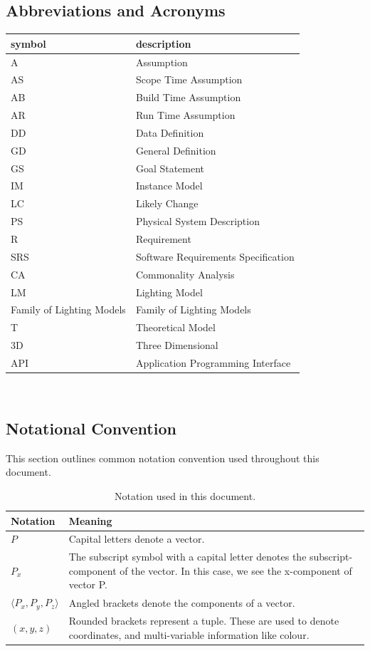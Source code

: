 \documentclass[12pt]{article}
\newcommand{\famname}{Family of Lighting Models} %
\begin{document}
\subsection{Abbreviations and Acronyms}

\renewcommand{\arraystretch}{1.2}
\begin{tabular}{l l} 
	\toprule		
	\textbf{symbol} & \textbf{description}\\
	\midrule 
	A & Assumption\\
	AS & Scope Time Assumption \\
	AB & Build Time Assumption \\
	AR & Run Time Assumption \\
	DD & Data Definition\\
	GD & General Definition\\
	GS & Goal Statement\\
	IM & Instance Model\\
	LC & Likely Change\\
	PS & Physical System Description\\
	R & Requirement\\
	SRS & Software Requirements Specification\\
	CA & Commonality Analysis \\
	LM & Lighting Model\\
	\famname{} & \famname{}\\
	T & Theoretical Model\\
	3D & Three Dimensional \\
	API & Application Programming Interface \\
	\bottomrule
\end{tabular}\\


\subsection{Notational Convention}
This section outlines common notation convention used throughout this document.

\begin{table}[H]
	\begin{tabular}{|l|p{15cm}|}
		\hline
		\textbf{Notation} & \textbf{Meaning} \\
		\hline
		$P$ & Capital letters denote a vector. \\
		\hline
		$P_{x}$ & The subscript symbol with a capital letter denotes the 
		subscript-component of the vector. In this case, we see the x-component 
		of vector P. \\
		\hline		
		$\langle P_{x}, P_{y}, P_{z} \rangle$ & Angled brackets denote the 
		components of a vector. \\
		\hline
		$(x, y, z)$ & Rounded brackets represent a tuple. These are used to 
		denote coordinates, and multi-variable information like colour. \\
		\hline
	\end{tabular}
	\caption{Notation used in this document.}
	\label{tbl:notation-convention}
\end{table}
\end{document}
